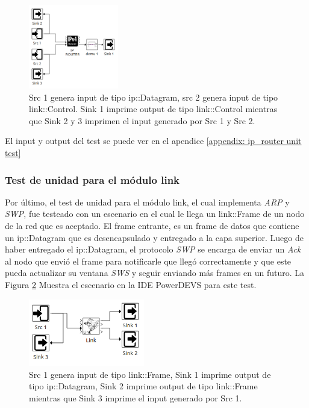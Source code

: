 \documentclass[10pt,a4paper]{article}
\begin{document}
\begin{figure}[!thb]
    \centering
    \includegraphics[width = 0.35\textwidth]{img/png/unit_tests/ip_router.png}
    \caption{Src 1 genera input de tipo ip::Datagram, src 2 genera input de tipo link::Control. Sink 1 imprime output de tipo link::Control mientras que Sink 2 y 3 imprimen el input generado por Src 1 y Src 2.}
    \label{figure: unit test ip router}
\end{figure}

El input y output del test se puede ver en el apendice \ref{appendix: ip_router unit test}

\newpage

\subsubsection{Test de unidad para el módulo link}

Por último, el test de unidad para el módulo link, el cual implementa \textit{ARP} y \textit{SWP}, fue testeado con un escenario en el cual le llega un link::Frame de un nodo de la red que es aceptado. El frame entrante, es un frame de datos que contiene un ip::Datagram que es desencapsulado y entregado a la capa superior. Luego de haber entregado el ip::Datagram, el protocolo \textit{SWP} se encarga de enviar un \textit{Ack} al nodo que envió el frame para notificarle que llegó correctamente y que este pueda actualizar su ventana \textit{SWS} y seguir enviando más frames en un futuro. La Figura \ref{figure: unit test link} Muestra el escenario en la IDE PowerDEVS para este test. \\

\begin{figure}[!h]
    \centering
    \includegraphics[width = 0.45\textwidth]{img/png/unit_tests/link.png}
    \caption{Src 1 genera input de tipo link::Frame, Sink 1 imprime output de tipo ip::Datagram, Sink 2 imprime output de tipo link::Frame mientras que Sink 3 imprime el input generado por Src 1.}
    \label{figure: unit test link}
\end{figure}
\end{document}
